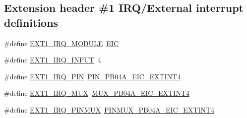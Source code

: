 \subsection*{Extension header \#1 I\+R\+Q/\+External interrupt definitions}
\begin{DoxyCompactItemize}
\item 
\#define \mbox{\hyperlink{group__samd21__xplained__pro__features__group_ga4b464579ccb12a975a0d23df1c52fed8}{E\+X\+T1\+\_\+\+I\+R\+Q\+\_\+\+M\+O\+D\+U\+LE}}~\mbox{\hyperlink{group___s_a_m_d21_j18_a__base_ga27183a94584b5fca7e1207ce7a79782a}{E\+IC}}
\item 
\#define \mbox{\hyperlink{group__samd21__xplained__pro__features__group_gae7ca49f8ea06da930916046cbcde0529}{E\+X\+T1\+\_\+\+I\+R\+Q\+\_\+\+I\+N\+P\+UT}}~4
\item 
\#define \mbox{\hyperlink{group__samd21__xplained__pro__features__group_gadfb4a45b28f4fe0ccb122a7b123a3d9f}{E\+X\+T1\+\_\+\+I\+R\+Q\+\_\+\+P\+IN}}~\mbox{\hyperlink{pio_2samd21j18a_8h_a2fc2cfd9a8382477493f71f73bfb7455}{P\+I\+N\+\_\+\+P\+B04\+A\+\_\+\+E\+I\+C\+\_\+\+E\+X\+T\+I\+N\+T4}}
\item 
\#define \mbox{\hyperlink{group__samd21__xplained__pro__features__group_gae71aefb06dd7834030456139f3e19d9a}{E\+X\+T1\+\_\+\+I\+R\+Q\+\_\+\+M\+UX}}~\mbox{\hyperlink{pio_2samd21j18a_8h_a7f6000b0eacaaba1538ec2a0cf404a71}{M\+U\+X\+\_\+\+P\+B04\+A\+\_\+\+E\+I\+C\+\_\+\+E\+X\+T\+I\+N\+T4}}
\item 
\#define \mbox{\hyperlink{group__samd21__xplained__pro__features__group_ga556d8241bd3ae14ae5397437a8e9c9d3}{E\+X\+T1\+\_\+\+I\+R\+Q\+\_\+\+P\+I\+N\+M\+UX}}~\mbox{\hyperlink{pio_2samd21j18a_8h_ab4e046f51ad6b5fb50b32fb65616f6e6}{P\+I\+N\+M\+U\+X\+\_\+\+P\+B04\+A\+\_\+\+E\+I\+C\+\_\+\+E\+X\+T\+I\+N\+T4}}
\end{DoxyCompactItemize}
